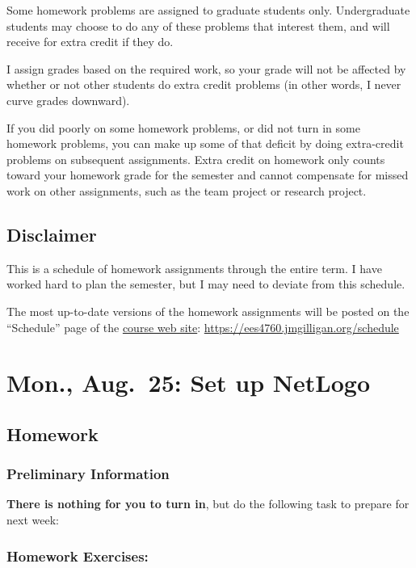 \documentclass[
]{article}
\begin{document}
Some homework problems are assigned to graduate students only.
Undergraduate students may choose to do any of these problems that
interest them, and will receive for extra credit if they do.

I assign grades based on the required work, so your grade will not be
affected by whether or not other students do extra credit problems (in
other words, I never curve grades downward).

If you did poorly on some homework problems, or did not turn in some
homework problems, you can make up some of that deficit by doing
extra-credit problems on subsequent assignments. Extra credit on
homework only counts toward your homework grade for the semester and
cannot compensate for missed work on other assignments, such as the team
project or research project.

\subsection{Disclaimer}\label{disclaimer}

This is a schedule of homework assignments through the entire term. I
have worked hard to plan the semester, but I may need to deviate from
this schedule.

The most up-to-date versions of the homework assignments will be posted
on the ``Schedule'' page of the
\href{https://ees4760.jmgilligan.org/schedule}{course web site}:
\url{https://ees4760.jmgilligan.org/schedule}

\section{Mon., Aug.~25: Set up
NetLogo}\label{mon.-aug.-25-set-up-netlogo}

\subsection{Homework}\label{homework}

\subsubsection{Preliminary Information}\label{preliminary-information}

\textbf{There is nothing for you to turn in}, but do the following task
to prepare for next week:

\subsubsection{Homework Exercises:}\label{homework-exercises}
\end{document}
